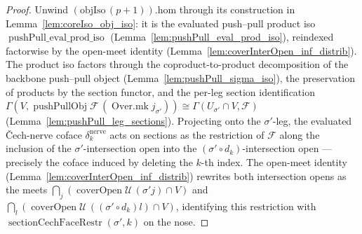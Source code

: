 \begin{proof}
  Unwind \((\mathrm{objIso}\,(p+1)).\mathrm{hom}\) through its construction in
  Lemma~\ref{lem:coreIso_obj_iso}: it is the evaluated push--pull product iso
  \(\operatorname{pushPull\_eval\_prod\_iso}\) (Lemma~\ref{lem:pushPull_eval_prod_iso}),
  reindexed factorwise by the open-meet identity (Lemma~\ref{lem:coverInterOpen_inf_distrib}).
  The product iso factors through the coproduct-to-product decomposition of the backbone
  push--pull object (Lemma~\ref{lem:pushPull_sigma_iso}), the preservation of products by the
  section functor, and the per-leg section identification
  \(\Gamma(V, \operatorname{pushPullObj}\mathcal{F}\,(\operatorname{Over.mk} j_{\sigma'})) \cong
  \Gamma(U_{\sigma'} \cap V, \mathcal{F})\) (Lemma~\ref{lem:pushPull_leg_sections}). Projecting
  onto the \(\sigma'\)-leg, the evaluated {\v C}ech-nerve coface \(\delta^{\mathrm{nerve}}_k\)
  acts on sections as the restriction of \(\mathcal{F}\) along the inclusion of the
  \(\sigma'\)-intersection open into the \((\sigma' \circ d_k)\)-intersection open — precisely the
  coface induced by deleting the \(k\)-th index. The open-meet identity
  (Lemma~\ref{lem:coverInterOpen_inf_distrib}) rewrites both intersection opens as the meets
  \(\bigcap_j(\operatorname{coverOpen}\mathcal{U}\,(\sigma' j) \cap V)\) and
  \(\bigcap_l(\operatorname{coverOpen}\mathcal{U}\,((\sigma' \circ d_k) l) \cap V)\), identifying
  this restriction with \(\operatorname{sectionCechFaceRestr}(\sigma', k)\) on the nose.
\end{proof}

